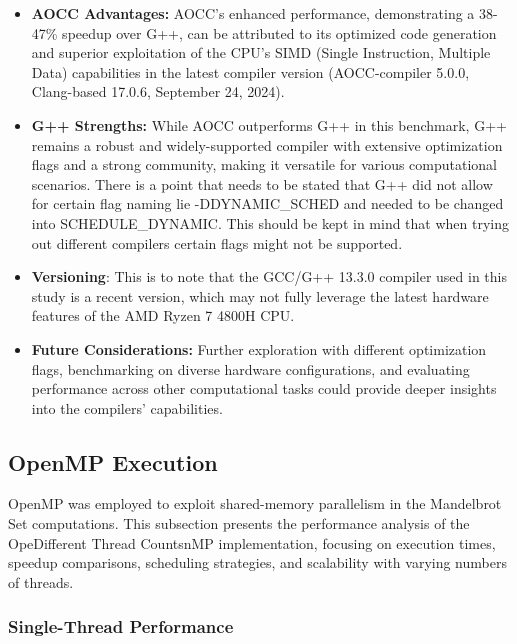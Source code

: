 \documentclass[
	report, %
	11pt, %
]{CSUniSchoolLabReport}
\newcounter{ct}
\begin{document}
\begin{itemize}
	\item \textbf{AOCC Advantages:} AOCC's enhanced performance, demonstrating a 38-47\% speedup over G++, can be attributed to its optimized code generation and superior exploitation of the CPU's SIMD (Single Instruction, Multiple Data) capabilities in the latest compiler version (AOCC-compiler 5.0.0, Clang-based 17.0.6, September 24, 2024).
	\item \textbf{G++ Strengths:} While AOCC outperforms G++ in this benchmark, G++ remains a robust and widely-supported compiler with extensive optimization flags and a strong community, making it versatile for various computational scenarios. There is a point that needs to be stated that G++ did not allow for certain flag naming lie -DDYNAMIC_SCHED and needed to be changed into SCHEDULE_DYNAMIC. This should be kept in mind that when trying out different compilers certain flags might not be supported.
	\item \textbf{Versioning}: This is to note that the GCC/G++ 13.3.0 compiler used in this study is a recent version, which may not fully leverage the latest hardware features of the AMD Ryzen 7 4800H CPU.
	\item \textbf{Future Considerations:} Further exploration with different optimization flags, benchmarking on diverse hardware configurations, and evaluating performance across other computational tasks could provide deeper insights into the compilers' capabilities.
\end{itemize}

\subsection{OpenMP Execution}

OpenMP was employed to exploit shared-memory parallelism in the Mandelbrot Set computations. This subsection presents the performance analysis of the OpeDifferent Thread CountsnMP implementation, focusing on execution times, speedup comparisons, scheduling strategies, and scalability with varying numbers of threads.

\subsubsection{Single-Thread Performance}
\end{document}

